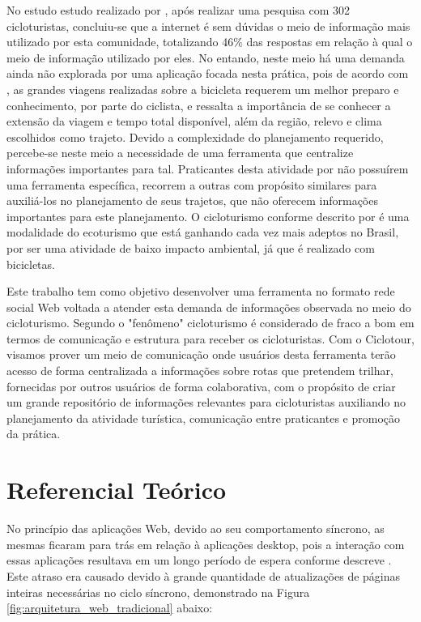 No estudo estudo realizado por \cite{perfilCicloturista}, após realizar uma pesquisa com 302 cicloturistas, concluiu-se que a internet é sem dúvidas 
o meio de informação mais utilizado por esta comunidade, totalizando 46\% das respostas em relação à qual o meio de informação utilizado por eles.
No entando, neste meio há uma demanda ainda não explorada por uma aplicação focada nesta prática, pois de acordo com \cite{cicloturismo02}, 
as grandes viagens realizadas sobre a bicicleta requerem um melhor preparo e conhecimento, por parte do ciclista, e ressalta a importância de se 
conhecer a extensão da viagem e tempo total disponível, além da região, relevo e clima escolhidos como trajeto. Devido a complexidade do planejamento
requerido, percebe-se neste meio a necessidade de uma ferramenta que centralize informações importantes para tal. Praticantes desta atividade por não 
possuírem uma ferramenta específica, recorrem a outras com propósito similares para auxiliá-los no planejamento de seus trajetos, que não oferecem 
informações importantes para este planejamento. O cicloturismo conforme descrito por \cite{cicloturismo01} é uma modalidade do ecoturismo que está 
ganhando cada vez mais adeptos no Brasil, por ser uma atividade de baixo impacto ambiental, já que é realizado com bicicletas.

Este trabalho tem como objetivo desenvolver uma ferramenta no formato rede social Web voltada a atender esta demanda de informações observada 
no meio do cicloturismo. Segundo \cite{perfilCicloturista} o  "fenômeno" cicloturismo é considerado de fraco a bom em termos de comunicação 
e estrutura para receber os cicloturistas. Com o Ciclotour, visamos prover um meio de comunicação onde usuários desta ferramenta terão acesso de 
forma centralizada a informações sobre rotas que pretendem trilhar, fornecidas por outros usuários de forma colaborativa, com o propósito 
de criar um grande repositório de informações relevantes para cicloturistas auxiliando no planejamento da atividade turística, comunicação entre 
praticantes e promoção da prática.

\section{\esp Referencial Teórico}
No princípio das aplicações Web, devido ao seu comportamento síncrono, as mesmas ficaram para trás em relação à aplicações desktop, pois a interação 
com essas aplicações resultava em um longo período de espera conforme descreve \cite{deitelAjax}. Este atraso era causado devido à grande quantidade 
de atualizações de páginas inteiras necessárias no ciclo síncrono, demonstrado na Figura \ref{fig:arquitetura_web_tradicional} abaixo: 

